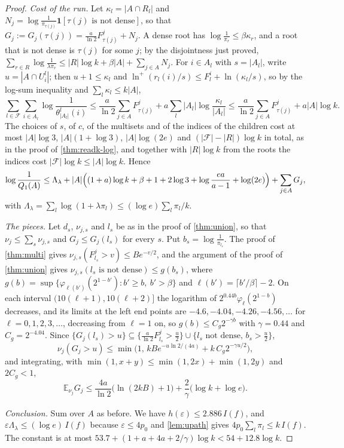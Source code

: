 \documentclass[11pt]{amsart}
\theoremstyle{definition}
\theoremstyle{remark}
\newcommand{\E}{\mathbb{E}}
\begin{document}
\begin{proof}
\emph{Cost of the run.} Let $\kappa_l=|A\cap R_l|$ and $N_j=\log\frac1{\pi_{\tau(j)}}\mathbf1[\tau(j)\text{ is not
dense}]$, so that $G_j:=G_j(\tau(j))=\frac a{\ln2}F^j_{\tau(j)}+N_j$. A dense root has $\log\frac1{\pi_r}\le\beta\kappa_r$,
and a root that is not dense is $\tau(j)$ for some $j$; by the disjointness just proved,
$\sum_{r\in R}\log\frac1{\lambda\pi_r}\le|R|\log k+\beta|A|+\sum_{j\in A}N_j$. For $i\in A_l$ with $s=|A_l|$, write
$u=|A\cap U^l_i|$; then $u+1\le\kappa_l$ and $\ln^+(r_l(i)/s)\le F^i_l+\ln(\kappa_l/s)$, so by the log-sum inequality and
$\sum_l\kappa_l\le k|A|$,
\[
\sum_{l\in\mathcal F}\sum_{i\in A_l}\log\frac1{\theta^l_{|A_l|}(i)}\le\frac a{\ln2}\sum_{j\in A}F^j_{\tau(j)}
+a\sum_l|A_l|\log\frac{\kappa_l}{|A_l|}\le\frac a{\ln2}\sum_{j\in A}F^j_{\tau(j)}+a|A|\log k .
\]
The choices of $s$, of $c$, of the multisets and of the indices of the children cost at most $|A|\log3$,
$|A|(1+\log3)$, $|A|\log(2e)$ and $(|\mathcal F|-|R|)\log k$ in total, as in the proof of \cref{thm:readk-log}, and
together with $|R|\log k$ from the roots the indices cost $|\mathcal F|\log k\le|A|\log k$. Hence
\[
\log\frac1{Q_1(A)}\le\Lambda_\lambda+|A|\Bigl((1+a)\log k+\beta+1+2\log3+\log\frac{ea}{a-1}+\log(2e)\Bigr)
+\sum_{j\in A}G_j,
\]
with $\Lambda_\lambda=\sum_l\log(1+\lambda\pi_l)\le(\log e)\sum_l\pi_l/k$.

\emph{The pieces.} Let $d_s$, $\nu_{j,s}$ and $l_s$ be as in the proof of \cref{thm:union}, so that
$\nu_j\le\sum_s\nu_{j,s}$ and $G_j\le G_j(l_s)$ for every $s$. Put $b_s=\log\frac1{\pi_{l_s}}$. The proof of
\cref{thm:multi} gives $\nu_{j,s}(F^j_{l_s}>v)\le Be^{-v/2}$, and the argument of the proof of \cref{thm:union} gives
$\nu_{j,s}(l_s\text{ is not dense})\le g(b_s)$, where $g(b)=\sup\{\varphi_{\ell(b')}(2^{1-b'}):b'\ge b,\ b'>\beta\}$ and
$\ell(b')=\lceil b'/\beta\rceil-2$. On each interval $(10(\ell+1),10(\ell+2)]$ the logarithm of
$2^{0.44b}\varphi_\ell(2^{1-b})$ decreases, and its limits at the left end points are $-4.6,-4.04,-4.26,-4.56,\dots$ for
$\ell=0,1,2,3,\dots$, decreasing from $\ell=1$ on, so $g(b)\le C_g2^{-\gamma b}$ with $\gamma=0.44$ and
$C_g=2^{-4.04}$. Since $\{G_j(l_s)>u\}\subseteq\{\frac a{\ln2}F^j_{l_s}>\frac u2\}\cup\{l_s\text{ not dense},\,b_s>\frac u2\}$,
\[
\nu_j(G_j>u)\le\min\bigl(1,\,kBe^{-u\ln2/(4a)}+k\,C_g2^{-\gamma u/2}\bigr),
\]
and integrating, with $\min(1,x+y)\le\min(1,2x)+\min(1,2y)$ and $2C_g<1$,
\[
\E_{\nu_j}G_j\le\frac{4a}{\ln2}\bigl(\ln(2kB)+1\bigr)+\frac2\gamma\bigl(\log k+\log e\bigr).
\]

\emph{Conclusion.} Sum over $A$ as before. We have $h(\varepsilon)\le2.886\,I(f)$, and
$\varepsilon\Lambda_\lambda\le(\log e)\,I(f)$ because $\varepsilon\le4p_0$ and \cref{lem:upath} gives
$4p_0\sum_l\pi_l\le k\,I(f)$. The constant is at most $53.7+(1+a+4a+2/\gamma)\log k<54+12.8\log k$.
\end{proof}
\end{document}
